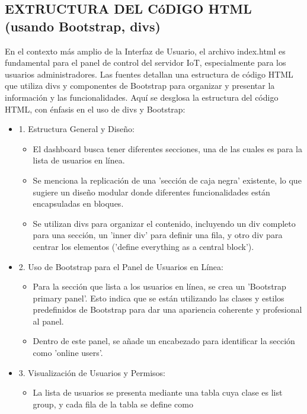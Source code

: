 \documentclass{report}
\begin{document}
\subsection{EXTRUCTURA DEL CóDIGO HTML (usando Bootstrap, divs)}
En el contexto más amplio de la Interfaz de Usuario, el archivo index.html es fundamental para el panel de control del servidor IoT, 
especialmente para los usuarios administradores. Las fuentes detallan una estructura de código HTML que utiliza divs y componentes de 
Bootstrap para organizar y presentar la información y las funcionalidades.
Aquí se desglosa la estructura del código HTML, con énfasis en el uso de divs y Bootstrap:
\begin{itemize}
    \item 1. Estructura General y Diseño:
        \begin{itemize}
            \item El dashboard busca tener diferentes secciones, una de las cuales es para la lista de usuarios en línea.
            \item Se menciona la replicación de una 'sección de caja negra' existente, lo que sugiere un diseño modular donde diferentes 
            funcionalidades están encapsuladas en bloques.
            \item Se utilizan divs para organizar el contenido, incluyendo un div completo para una sección, un 'inner div' para definir 
            una fila, y otro div para centrar los elementos ('define everything as a central block').
        \end{itemize}
    \item 2. Uso de Bootstrap para el Panel de Usuarios en Línea:
        \begin{itemize}
            \item Para la sección que lista a los usuarios en línea, se crea un 'Bootstrap primary panel'. Esto indica que se están 
            utilizando las clases y estilos predefinidos de Bootstrap para dar una apariencia coherente y profesional al panel.
            \item Dentro de este panel, se añade un encabezado para identificar la sección como 'online users'.
        \end{itemize}
    \item 3. Visualización de Usuarios y Permisos:
        \begin{itemize}
            \item La lista de usuarios se presenta mediante una tabla cuya clase es list group, y cada fila de la tabla se define como 

\end{itemize}
\end{itemize}
\end{document}
